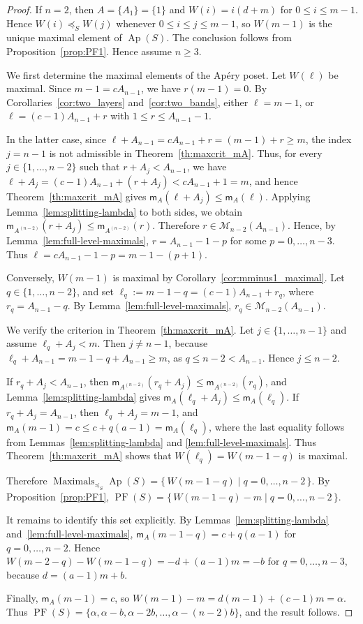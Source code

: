 \documentclass[10pt,a4paper]{amsart}
\begin{document}
\begin{proof}
If $n=2$, then $A=\{A_1\}=\{1\}$ and
$W(i)=i(d+m)$ for $0\le i\le m-1$. Hence
$W(i)\preceq_S W(j)$ whenever $0\le i\le j\le m-1$, so
$W(m-1)$ is the unique maximal element of $\operatorname{Ap}(S)$. The conclusion follows from Proposition~\ref{prop:PF1}. Hence assume $n\ge 3$.

We first determine the maximal elements of the Ap\'ery poset. Let
$W(\ell)$ be maximal. Since $m-1=cA_{n-1}$, we have $r(m-1)=0$. By
Corollaries~\ref{cor:two_layers} and~\ref{cor:two_bands}, either
$\ell=m-1$, or $\ell=(c-1)A_{n-1}+r$ with $1\le r\le A_{n-1}-1$.

In the latter case, since $
\ell+A_{n-1}=cA_{n-1}+r=(m-1)+r\ge m$,
the index $j=n-1$ is not admissible in Theorem~\ref{th:maxcrit_mA}.
Thus, for every $j\in\{1,\ldots,n-2\}$ such that $r+A_j<A_{n-1}$, we have
$
\ell+A_j=(c-1)A_{n-1}+(r+A_j)<cA_{n-1}+1=m$,
and hence Theorem~\ref{th:maxcrit_mA} gives
$
\mathsf m_A(\ell+A_j)\le \mathsf m_A(\ell).
$
Applying Lemma~\ref{lem:splitting-lambda} to both sides, we obtain $
\mathsf m_{A^{(n-2)}}(r+A_j)\le \mathsf m_{A^{(n-2)}}(r)$.
Therefore $r\in \mathcal M_{n-2}(A_{n-1})$. Hence, by
Lemma~\ref{lem:full-level-maximals}, $r=A_{n-1}-1-p$ for some
$p=0,\ldots,n-3$. Thus $\ell=cA_{n-1}-1-p=m-1-(p+1)$.

Conversely, $W(m-1)$ is maximal by
Corollary~\ref{cor:mminus1_maximal}. Let $q\in\{1,\ldots,n-2\}$, and set
$\ell_q:=m-1-q=(c-1)A_{n-1}+r_q$, where $r_q=A_{n-1}-q$. By
Lemma~\ref{lem:full-level-maximals}, $r_q\in\mathcal M_{n-2}(A_{n-1})$.

We verify the criterion in Theorem~\ref{th:maxcrit_mA}. Let
$j\in\{1,\ldots,n-1\}$ and assume $\ell_q+A_j<m$. Then $j\ne n-1$,
because $\ell_q+A_{n-1}=m-1-q+A_{n-1}\ge m$, as
$q\le n-2<A_{n-1}$. Hence $j\le n-2$.

If $r_q+A_j<A_{n-1}$, then
$\mathsf m_{A^{(n-2)}}(r_q+A_j)\le\mathsf m_{A^{(n-2)}}(r_q)$, and
Lemma~\ref{lem:splitting-lambda} gives
$\mathsf m_A(\ell_q+A_j)\le\mathsf m_A(\ell_q)$. If
$r_q+A_j=A_{n-1}$, then $\ell_q+A_j=m-1$, and
$\mathsf m_A(m-1)=c\le c+q(a-1)=\mathsf m_A(\ell_q)$, where the last
equality follows from Lemmas~\ref{lem:splitting-lambda} and
\ref{lem:full-level-maximals}. Thus Theorem~\ref{th:maxcrit_mA} shows
that $W(\ell_q)=W(m-1-q)$ is maximal.

Therefore $\operatorname{Maximals}_{\preceq_S}\operatorname{Ap}(S)
=
\{\,W(m-1-q)\mid q=0,\ldots,n-2\,\}$.
By Proposition~\ref{prop:PF1},
$\operatorname{PF}(S)=\{\,W(m-1-q)-m\mid q=0,\ldots,n-2\,\}$.

It remains to identify this set explicitly. By
Lemmas~\ref{lem:splitting-lambda} and~\ref{lem:full-level-maximals},
$\mathsf m_A(m-1-q)=c+q(a-1)$ for $q=0,\ldots,n-2$. Hence
$W(m-2-q)-W(m-1-q)=-d+(a-1)m=-b$ for $q=0,\ldots,n-3$, because
$d=(a-1)m+b$.

Finally, $\mathsf m_A(m-1)=c$, so
$W(m-1)-m=d(m-1)+(c-1)m=\alpha$. Thus
$\operatorname{PF}(S)=
\{\alpha,\alpha-b,\alpha-2b,\ldots,\alpha-(n-2)b\}$, and the result
follows.
\end{proof}
\end{document}
